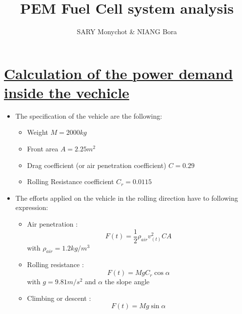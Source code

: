 \documentclass[12pt,a4paper]{article}
\numberwithin{equation}{section}
\begin{document}
	\title{\textbf{PEM Fuel Cell system analysis }}
	\author{SARY Monychot \& NIANG Bora }
	\maketitle
	\tableofcontents
		\newpage
	\section{\underline{Calculation of the power demand inside the vechicle}}
	\begin{itemize}
	 \item The specification of the vehicle are the following:
	
	\begin{itemize}
		\item  Weight $M = 2000 kg$
		\item Front area $A = 2.25  m^2$
		\item Drag coefficient (or air penetration coefficient) $C = 0.29$ 
		\item Rolling Resistance coefficient $C_r = 0.0115$
		
	\end{itemize}
	
	\item The efforts applied on the vehicle in the rolling direction have to following expression:
	
	\begin{itemize}
		\item Air penetration : 
		\begin{equation}
				F{(t)} = \frac{1}{2}\rho_{air}v^2_{(t)}CA  \label{eq1}
		\end{equation} with $\rho_{air} = 1.2    kg/m^3$
		\item Rolling resistance :	
		\begin{equation}
			 F(t) = MgC_r\cos{\alpha} \label{eq2}
		\end{equation}with $g = 9.81 m/s^2$ and $\alpha$ the slope angle
		\item Climbing or descent : 
		\begin{equation}
			F(t) = Mg\sin{\alpha} \label{eq3}
		\end{equation} 
		
	\end{itemize}
	\end{itemize}
	
\end{document}
